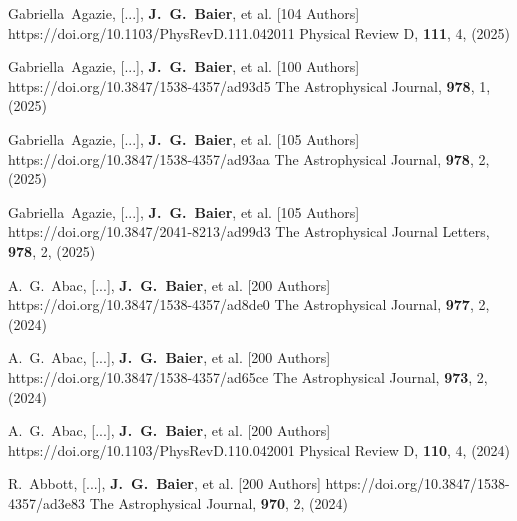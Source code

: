          {Gabriella~{Agazie}, [...], \textbf{J.~G.~{Baier}}, et al. [104 Authors]}
         {https://doi.org/10.1103/PhysRevD.111.042011}
         {{Physical Review D}, \textbf{111}, 4, (2025)}

         {Gabriella~{Agazie}, [...], \textbf{J.~G.~{Baier}}, et al. [100 Authors]}
         {https://doi.org/10.3847/1538-4357/ad93d5}
         {{The Astrophysical Journal}, \textbf{978}, 1, (2025)}

         {Gabriella~{Agazie}, [...], \textbf{J.~G.~{Baier}}, et al. [105 Authors]}
         {https://doi.org/10.3847/1538-4357/ad93aa}
         {{The Astrophysical Journal}, \textbf{978}, 2, (2025)}

         {Gabriella~{Agazie}, [...], \textbf{J.~G.~{Baier}}, et al. [105 Authors]}
         {https://doi.org/10.3847/2041-8213/ad99d3}
         {{The Astrophysical Journal Letters}, \textbf{978}, 2, (2025)}

         {A.~G.~{Abac}, [...], \textbf{J.~G.~{Baier}}, et al. [200 Authors]}
         {https://doi.org/10.3847/1538-4357/ad8de0}
         {{The Astrophysical Journal}, \textbf{977}, 2, (2024)}

         {A.~G.~{Abac}, [...], \textbf{J.~G.~{Baier}}, et al. [200 Authors]}
         {https://doi.org/10.3847/1538-4357/ad65ce}
         {{The Astrophysical Journal}, \textbf{973}, 2, (2024)}

         {A.~G.~{Abac}, [...], \textbf{J.~G.~{Baier}}, et al. [200 Authors]}
         {https://doi.org/10.1103/PhysRevD.110.042001}
         {{Physical Review D}, \textbf{110}, 4, (2024)}

         {R.~{Abbott}, [...], \textbf{J.~G.~{Baier}}, et al. [200 Authors]}
         {https://doi.org/10.3847/1538-4357/ad3e83}
         {{The Astrophysical Journal}, \textbf{970}, 2, (2024)}

